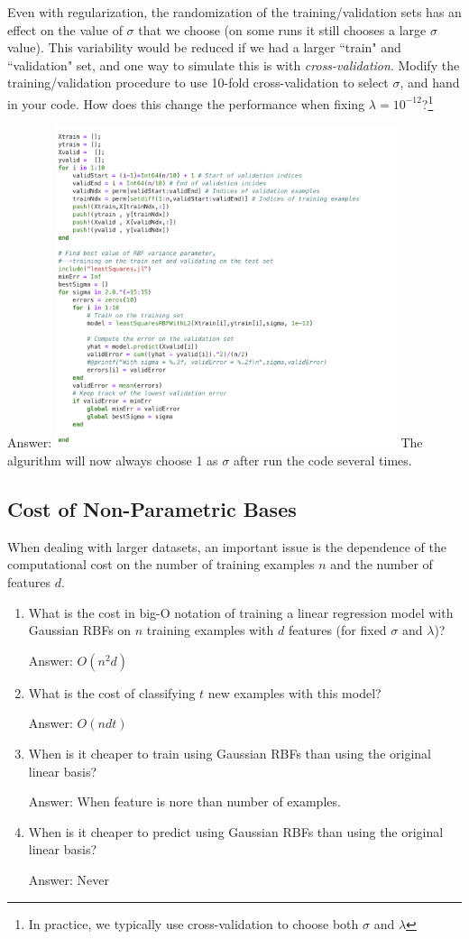 \documentclass{article}
\def\ans#1{\par\gre{Answer: #1}}
\def\blu#1{{\color{blu}#1}}
\def\gre#1{{\color{gre}#1}}
\def\enum#1{\begin{enumerate}#1\end{enumerate}}
\begin{document}
Even with regularization, the randomization of the training/validation sets has an effect on the value of $\sigma$ that we choose (on some runs it still chooses a large $\sigma$ value).
This variability would be reduced if we had a larger ``train" and ``validation" set, and one way to simulate this is with \emph{cross-validation}. \blu{Modify the training/validation procedure to use 10-fold cross-validation to select $\sigma$, and hand in your code. How does this change the performance when fixing $\lambda = 10^{-12}$?}\footnote{In practice, we typically use cross-validation to choose both $\sigma$ and $\lambda$}
\ans{ \includegraphics[width=10cm]{q12Code.png} The algurithm will now always choose 1 as $\sigma$ after run the code several times.}

\subsection{Cost of Non-Parametric Bases}

When dealing with larger datasets, an important issue is the dependence of the computational cost on the number of training examples $n$ and the number of features $d$. 
\blu{
\enum{
\item What is the cost in big-O notation of training a linear regression model with Gaussian RBFs on $n$ training examples with $d$ features (for fixed $\sigma$ and $\lambda$)?  \ans{$O(n^2d)$}
\item What is the cost of classifying $t$ new examples with this model? \ans{$O(ndt)$}
\item When is it cheaper to train using Gaussian RBFs than using the original linear basis? \ans{When feature is nore than number of examples.}
\item When is it cheaper to predict using Gaussian RBFs than using the original linear basis? \ans{Never}
}}
\end{document}
